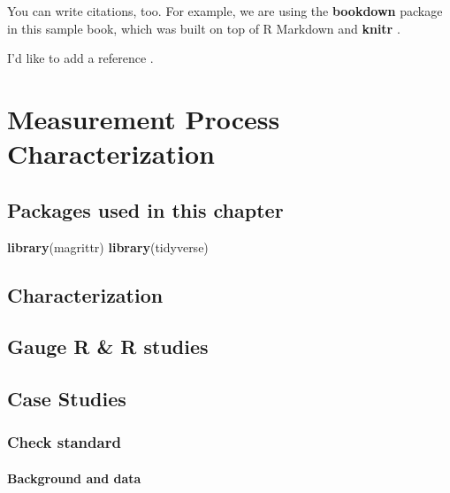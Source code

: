 \documentclass[]{book}
\newenvironment{Shaded}{\begin{snugshade}}{\end{snugshade}}
\newcommand{\KeywordTok}[1]{\textcolor[rgb]{0.13,0.29,0.53}{\textbf{#1}}}
\newcommand{\NormalTok}[1]{#1}
\theoremstyle{definition}
\theoremstyle{definition}
\theoremstyle{definition}
\theoremstyle{remark}
\begin{document}
You can write citations, too. For example, we are using the
\textbf{bookdown} package \citep{R-bookdown} in this sample book, which
was built on top of R Markdown and \textbf{knitr} \citep{xie2015}.

I'd like to add a reference \citep{Hoobler1993}.

\hypertarget{measurement-process-characterization}{%
\chapter{Measurement Process
Characterization}\label{measurement-process-characterization}}

\hypertarget{packages-used-in-this-chapter}{%
\section{Packages used in this
chapter}\label{packages-used-in-this-chapter}}

\begin{Shaded}
\begin{Highlighting}[]
\KeywordTok{library}\NormalTok{(magrittr)}
\KeywordTok{library}\NormalTok{(tidyverse)}
\end{Highlighting}
\end{Shaded}

\hypertarget{characterization}{%
\section{Characterization}\label{characterization}}

\hypertarget{gauge-r-r-studies}{%
\section{Gauge R \& R studies}\label{gauge-r-r-studies}}

\hypertarget{case-studies}{%
\section{Case Studies}\label{case-studies}}

\hypertarget{check-standard}{%
\subsection{Check standard}\label{check-standard}}

\hypertarget{background-and-data}{%
\subsubsection{Background and data}\label{background-and-data}}
\end{document}
